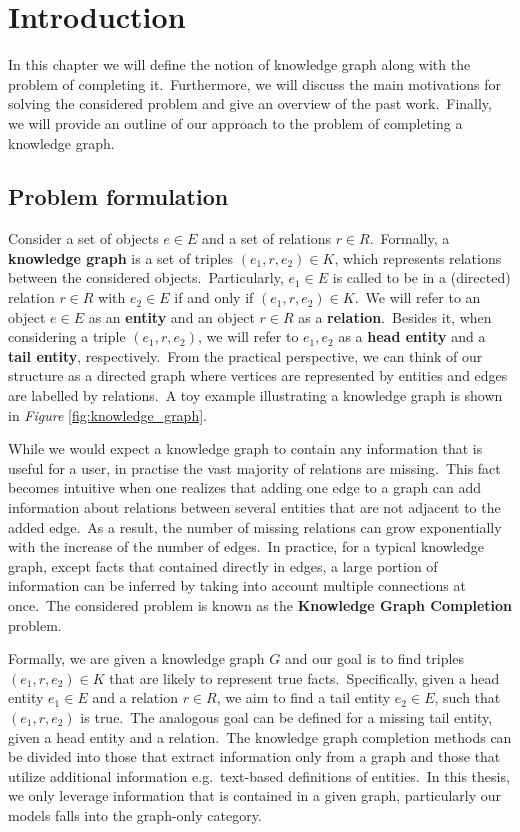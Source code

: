 \documentclass[longabstract, english, mgr]{iithesis}
\author         {Dawid Wegner}
\date           {29 września 2021}
\newcommand\numberedchapter[1]{\setlength\topskip{3cm}\chapter{#1}\setlength\topskip{0cm}}
\theoremstyle{default_theorem_style}\newtheorem{theorem}{Theorem}
\theoremstyle{default_theorem_style}\newtheorem{definition}{Definition}
\begin{document}
\numberedchapter{Introduction}

In this chapter we will define the notion of knowledge graph along with the problem of completing it.\ Furthermore,
we will discuss the main motivations for solving the considered problem and give an
overview of the past work.\ Finally, we will provide an outline of our approach to the problem of completing a
knowledge graph.

\section{Problem formulation}

Consider a set of objects $e \in E$ and a set of relations $r \in R$.\ Formally, a \textbf{knowledge graph} is a set
of triples $(e_1, r, e_2) \in K$, which represents relations between the considered objects.\ Particularly,
$e_1 \in E$ is called to be in a (directed) relation $r \in R$ with $e_2 \in E$ if and only if
$(e_1, r, e_2) \in K$.\ We will refer to an object $e \in E$ as an \textbf{entity} and an object
$r \in R$ as a \textbf{relation}.\ Besides it, when considering a triple $(e_1, r, e_2)$, we will refer to
$e_1, e_2$ as a \textbf{head entity} and a \textbf{tail entity}, respectively.\ From the practical perspective, we
can think of our structure as a directed graph where vertices are represented by entities and edges are labelled
by relations.\ A toy example illustrating a knowledge graph is shown in
\textit{Figure} \ref{fig:knowledge_graph}.\newline

\noindent While we would expect a knowledge graph to contain any information that is useful for a user, in practise
the vast majority of relations are missing.\ This fact becomes intuitive when one realizes that adding one edge
to a graph can add information about relations between several entities that are not adjacent to the added
edge.\ As a result, the number of missing relations can grow exponentially with the increase of the number of
edges.\ In practice, for a typical knowledge graph, except facts that contained directly in edges, a
large portion of information can be inferred by taking into account multiple connections at once.\ The considered
problem is known as the \textbf{Knowledge Graph Completion} problem.\newline

\noindent Formally, we are given a knowledge graph $G$ and our goal is to find triples $(e_1, r, e_2) \in K$ that
are likely to represent true facts.\ Specifically, given a head entity $e_1 \in E$ and a relation $r \in R$, we
aim to find a tail entity $e_2 \in E$, such that $(e_1, r, e_2)$ is true.\ The analogous goal can be defined for
a missing tail entity, given a head entity and a relation.\ The knowledge graph completion methods can be divided
into those that extract information only from a graph and those that utilize additional information e.g.\ text-based
definitions of entities.\ In this thesis, we only leverage information that is contained in a given graph,
particularly our models falls into the graph-only category.
\end{document}
